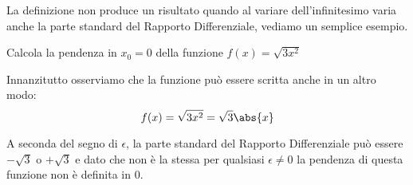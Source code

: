 La definizione non produce un risultato quando al variare 
dell'infinitesimo varia anche la parte standard del 
Rapporto Differenziale, vediamo un semplice esempio.
\begin{esempio}
\label{esempio:differenziazione_derimodulo}
Calcola la pendenza in \(x_0 = 0\) della funzione \(f(x) = \sqrt{3x^2}\)

Innanzitutto osserviamo che la funzione può essere scritta anche in un altro 
modo: 
\[f(x) = \sqrt{3x^2} = \sqrt{3} \abs{x}\]


A seconda del segno di \(\epsilon\), la parte standard del Rapporto 
Differenziale può essere \(-\sqrt{3}\) o \(+\sqrt{3}\) e dato che non è la 
stessa per qualsiasi \(\epsilon \ne 0\) la pendenza di questa funzione non è 
definita in \(0\).

\end{esempio}

